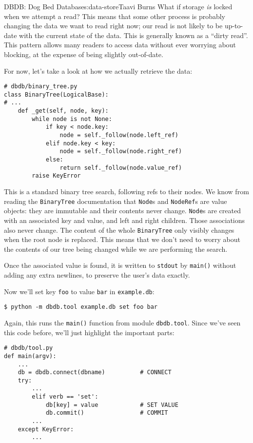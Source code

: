 \begin{aosachapter}{DBDB: Dog Bed Database}{s:data-store}{Taavi Burns}
What if storage \emph{is} locked when we attempt a read? This means that
some other process is probably changing the data we want to read right
now; our read is not likely to be up-to-date with the current state of
the data. This is generally known as a ``dirty read''. This pattern
allows many readers to access data without ever worrying about blocking,
at the expense of being slightly out-of-date.

For now, let's take a look at how we actually retrieve the data:

\begin{verbatim}
# dbdb/binary_tree.py
class BinaryTree(LogicalBase):
# ...
    def _get(self, node, key):
        while node is not None:
            if key < node.key:
                node = self._follow(node.left_ref)
            elif node.key < key:
                node = self._follow(node.right_ref)
            else:
                return self._follow(node.value_ref)
        raise KeyError
\end{verbatim}

This is a standard binary tree search, following refs to their nodes. We
know from reading the \texttt{BinaryTree} documentation that
\texttt{Node}s and \texttt{NodeRef}s are value objects: they are
immutable and their contents never change. \texttt{Node}s are created
with an associated key and value, and left and right children. Those
associations also never change. The content of the whole
\texttt{BinaryTree} only visibly changes when the root node is replaced.
This means that we don't need to worry about the contents of our tree
being changed while we are performing the search.

Once the associated value is found, it is written to \texttt{stdout} by
\texttt{main()} without adding any extra newlines, to preserve the
user's data exactly.

\label{inserting-and-updating}

Now we'll set key \texttt{foo} to value \texttt{bar} in
\texttt{example.db}:

\begin{verbatim}
$ python -m dbdb.tool example.db set foo bar
\end{verbatim}

Again, this runs the \texttt{main()} function from module
\texttt{dbdb.tool}. Since we've seen this code before, we'll just
highlight the important parts:

\begin{verbatim}
# dbdb/tool.py
def main(argv):
    ...
    db = dbdb.connect(dbname)          # CONNECT
    try:
        ...
        elif verb == 'set':
            db[key] = value            # SET VALUE
            db.commit()                # COMMIT
        ...
    except KeyError:
        ...
\end{verbatim}


\end{aosachapter}
